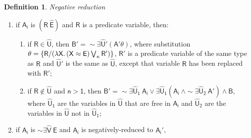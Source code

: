 \documentclass[inscr,ack,preface]{dithesis}
\theoremstyle{definition}
\newtheorem{definition}{Definition}[]
\newcommand{\msf}[1]{$\mathsf{#1}$}
\begin{document}
\begin{definition}{\emph{Negative reduction}}
\begin{enumerate}
\begin{enumerate}
                \\where \msf{\theta = unify \left( E_1, E_2 \right)} and \msf{\widehat{X} = dom\left( \theta \right)};
          \item if \msf{\sim \exists \widehat{U} \left( E_1 \approx E_2 \right)} is unsatisfiable and either \msf{E_1} or \msf{E_2} is a variable in \msf{\widehat{U}},
          \\then \msf{B' = \sim \exists \widehat{U} \left( A' \theta \right)}, where \msf{\theta = \{ X / E \}} and \msf{X} is the one expression that is a variable in \msf{\widehat{U}} and \msf{E} is the other;
          \item if \msf{\sim \exists \widehat{U} \left( E_1 \approx E_2 \right)}
                is primitive and \msf{n > 1}, \\
                then \msf{B' = \sim \exists \widehat{U}_1 ~ A_i \lor \exists \widehat{U}_1 \left( A_i ~\land \sim \exists \widehat{U}_2 ~ A' \right)}, where \msf{\widehat{U}_1} are the variables in \msf{\widehat{U}} that are free in \msf{A_i} and \msf{\widehat{U}_2} are the variables in \msf{\widehat{U}} not in \msf{\widehat{U}_1};
        \end{enumerate}
  \item if \msf{A_i} is \msf{\left( R ~ \widehat{E} \right)} and \msf{R} is a predicate variable, then:
        \begin{enumerate}
          \item if \msf{R \in \widehat{U}},
                then \msf{B' = \sim \exists \widehat{U}' \left( A' \theta \right)},
                where substitution \msf{\theta = \left\{ R \middle/ \left( \lambda X . \left( X \approx E \right) \bigvee_{\kappa} R' \right) \right\}}, \msf{R'} is a predicate variable of the same type as \msf{R} and \msf{\widehat{U}'} is the same as \msf{\widehat{U}}, except that variable \msf{R} has been replaced with \msf{R'};
          \item if \msf{R \not \in \widehat{U}} and \msf{n > 1},
                then \msf{B' = \sim \exists \widehat{U}_1 ~ A_i \lor \exists \widehat{U}_1 \left( A_i ~\land \sim \exists \widehat{U}_2 ~ A' \right) \land B},
                where \msf{\widehat{U}_1} are the variables in \msf{\widehat{U}} that are free in \msf{A_i} and \msf{\widehat{U}_2} are the variables in \msf{\widehat{U}} not in \msf{\widehat{U}_1};
        \end{enumerate}
  \item if \msf{A_i} is \msf{\sim \exists \widehat{V} ~ E} and \msf{A_i} is negatively-reduced to \msf{A_i'}, \\

\end{enumerate}
\end{definition}
\end{document}
